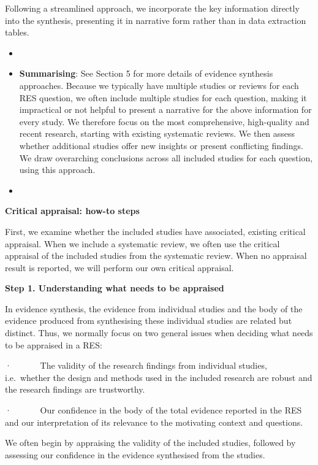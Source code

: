 \documentclass[
  letterpaper,
  DIV=11,
  numbers=noendperiod]{scrreprt}
\begin{document}
Following a streamlined approach, we incorporate the key information
directly into the synthesis, presenting it in narrative form rather than
in data extraction tables.

\begin{itemize}
\item
\item
  \textbf{Summarising}: See Section 5 for more details of evidence
  synthesis approaches. Because we typically have multiple studies or
  reviews for each RES question, we often include multiple studies for
  each question, making it impractical or not helpful to present a
  narrative for the above information for every study. We therefore
  focus on the most comprehensive, high-quality and recent research,
  starting with existing systematic reviews. We then assess whether
  additional studies offer new insights or present conflicting findings.
  We draw overarching conclusions across all included studies for each
  question, using this approach.
\item
\end{itemize}

\textbf{Critical appraisal: how-to steps}

First, we examine whether the included studies have associated, existing
critical appraisal. When we include a systematic review, we often use
the critical appraisal of the included studies from the systematic
review. When no appraisal result is reported, we will perform our own
critical appraisal.

\textbf{Step 1. Understanding what needs to be appraised}

In evidence synthesis, the evidence from individual studies and the body
of the evidence produced from synthesising these individual studies are
related but distinct. Thus, we normally focus on two general issues when
deciding what needs to be appraised in a RES:

·~~~~~~ The validity of the research findings from individual studies,
i.e.~whether the design and methods used in the included research are
robust and the research findings are trustworthy.

·~~~~~~ Our confidence in the body of the total evidence reported in the
RES and our interpretation of its relevance to the motivating context
and questions.

We often begin by appraising the validity of the included studies,
followed by assessing our confidence in the evidence synthesised from
the studies.
\end{document}
